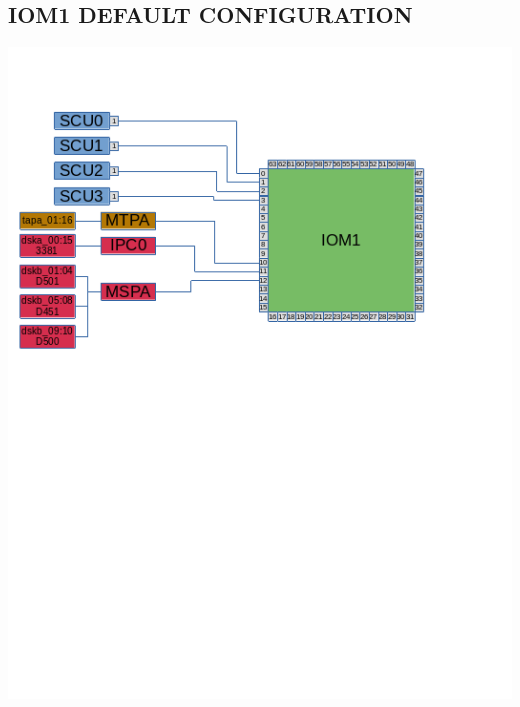 \subsection[IOM1 Default Configuration]{IOM1 DEFAULT CONFIGURATION}
\begin{center}
    \includegraphics{DefaultCablingDiagram-IOM1.png}
\end{center}
